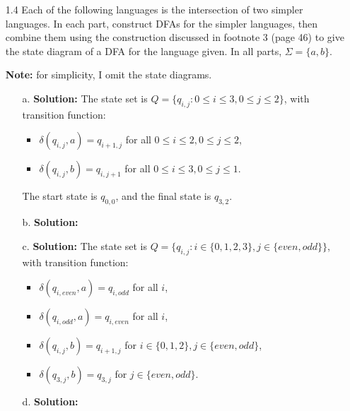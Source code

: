 \begin{enumerate}
\item[1.4]Each of the following languages is the intersection of two simpler languages. In each part, construct DFAs for the simpler languages, then combine them using the construction discussed in footnote 3 (page 46) to give the state diagram of a DFA for the language given. In all parts, $\Sigma = \{a, b\}$.

\par \textbf{Note:} for simplicity, I omit the state diagrams. 
\begin{enumerate}
\item[a.]\textbf{Solution:} The state set is $Q = \{q_{i, j} \colon 0 \le i \le 3, 0 \le j \le 2\}$, with transition function:
\begin{itemize}
\item $\delta(q_{i, j}, a) = q_{i+1, j}$ for all $0 \le i \le 2, 0 \le j \le 2$,
\item $\delta(q_{i, j}, b) = q_{i, j+1}$ for all $0 \le i \le 3, 0 \le j \le 1$.
\end{itemize}
The start state is $q_{0, 0}$, and the final state is $q_{3, 2}$. 
\item[b.]\textbf{Solution:} \alreadyanswered
\item[c.]\textbf{Solution:} The state set is $Q = \{q_{i, j} \colon i \in \{0, 1, 2, 3\}, j \in \{even, odd\}\}$, with transition function:
\begin{itemize}
\item $\delta(q_{i, even}, a) = q_{i, odd}$ for all $i$,
\item $\delta(q_{i, odd}, a) = q_{i, even}$ for all $i$,
\item $\delta(q_{i, j}, b) = q_{i+1, j}$ for $i \in \{0, 1, 2\}, j \in \{even, odd\}$,
\item $\delta(q_{3, j}, b) = q_{3, j}$ for $j \in \{even, odd\}$.
\end{itemize}

\item[d.]\textbf{Solution:} \alreadyanswered
\end{enumerate}


\end{enumerate}
